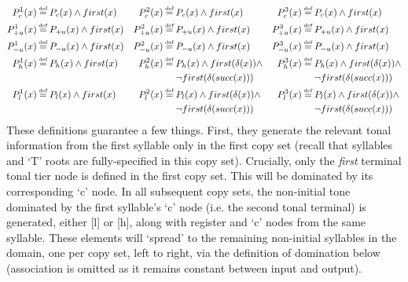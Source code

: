 \documentclass{article}
\newcommand\myeq{\mathrel{\stackrel{\makebox[0pt]{\mbox{\normalfont\tiny def}}}{=}}}
\begin{document}
\begin{equation}
\begin{aligned}
P^{1}_{c}(x)&\myeq P_{c}(x)\land first(x) & P^{2}_{c}(x)&\myeq P_{c}(x)\land first(x) & P^{3}_{c}(x)&\myeq P_{c}(x)\land first(x) \\
P^{1}_{+u}(x)&\myeq P_{+u}(x)\land first(x) & P^{2}_{+u}(x)&\myeq P_{+u}(x)\land first(x) & P^{3}_{+u}(x)&\myeq P_{+u}(x)\land first(x) \\
P^{1}_{-u}(x)&\myeq P_{-u}(x)\land first(x) & P^{2}_{-u}(x)&\myeq P_{-u}(x)\land first(x) & P^{3}_{-u}(x)&\myeq P_{-u}(x)\land first(x) \\
P^{1}_{h}(x)&\myeq P_{h}(x)\land first(x) & P^{2}_{h}(x)&\myeq P_{h}(x)\land first(\delta(x))\land & P^{3}_{h}(x)&\myeq P_{h}(x)\land first(\delta(x))\land \\
&& &\quad\,\, \neg first(\delta(succ(x))) & &\quad\,\, \neg first(\delta(succ(x)))\\
P^{1}_{l}(x)&\myeq P_{l}(x)\land first(x) & P^{2}_{l}(x)&\myeq P_{l}(x)\land first(\delta(x))\land & P^{3}_{l}(x)&\myeq P_{l}(x)\land first(\delta(x))\land \\
&& &\quad\,\, \neg first(\delta(succ(x))) & &\quad\,\, \neg first(\delta(succ(x)))\\
\end{aligned}
\end{equation}
These definitions guarantee a few things. First, they generate the relevant tonal information from the first syllable only in the first copy set (recall that syllables and `T' roots are fully-specified in this copy set). Crucially, only the \emph{first} terminal tonal tier node is defined in the first copy set. This will be dominated by its corresponding `c' node. In all subsequent copy sets, the non-initial tone dominated by the first syllable's `c' node (i.e. the second tonal terminal) is generated, either [l] or [h], along with register and `c' nodes from the same syllable. These elements will `spread' to the remaining non-initial syllables in the domain, one per copy set, left to right, via the definition of domination below (association is omitted as it remains constant between input and output). 
\end{document}
